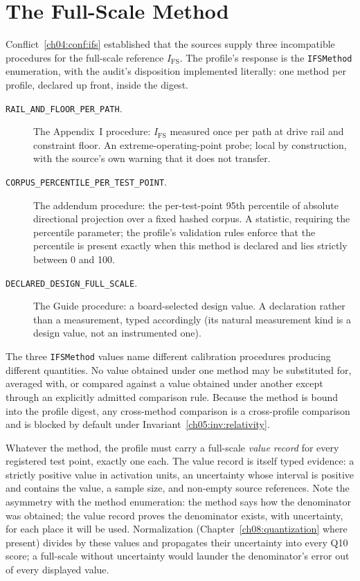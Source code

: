 \section{The Full-Scale Method}\label{ch05:ifs}

Conflict~\ref{ch04:conf:ifs} established that the sources supply three
incompatible procedures for the full-scale reference $I_{\mathrm{FS}}$. The
profile's response is the \texttt{IFSMethod} enumeration, with the audit's
disposition implemented literally: one method per profile, declared up
front, inside the digest.

\begin{description}
\item[\texttt{RAIL\_AND\_FLOOR\_PER\_PATH}.] The Appendix~I procedure:
$I_{\mathrm{FS}}$ measured once per path at drive rail and constraint
floor. An extreme-operating-point probe; local by construction, with the
source's own warning that it does not transfer.
\item[\texttt{CORPUS\_PERCENTILE\_PER\_TEST\_POINT}.] The addendum
procedure: the per-test-point 95th percentile of absolute directional
projection over a fixed hashed corpus. A statistic, requiring the
percentile parameter; the profile's validation rules enforce that the
percentile is present exactly when this method is declared and lies
strictly between 0 and 100.
\item[\texttt{DECLARED\_DESIGN\_FULL\_SCALE}.] The Guide procedure: a
board-selected design value. A declaration rather than a measurement, typed
accordingly (its natural measurement kind is a design value, not an
instrumented one).
\end{description}

\begin{ruleenv}\label{ch05:rule:ifs}
The three \texttt{IFSMethod} values name different calibration procedures
producing different quantities. No value obtained under one method may be
substituted for, averaged with, or compared against a value obtained under
another except through an explicitly admitted comparison rule. Because the
method is bound into the profile digest, any cross-method comparison is a
cross-profile comparison and is blocked by default under
Invariant~\ref{ch05:inv:relativity}.
\end{ruleenv}

Whatever the method, the profile must carry a full-scale \emph{value record}
for every registered test point, exactly one each. The value record is
itself typed evidence: a strictly positive value in activation units, an
uncertainty whose interval is positive and contains the value, a sample
size, and non-empty source references. Note the asymmetry with the method
enumeration: the method says how the denominator was obtained; the value
record proves the denominator exists, with uncertainty, for each place it
will be used. Normalization (Chapter~\ref{ch08:quantization} where present)
divides by these values and propagates their uncertainty into every Q10
score; a full-scale without uncertainty would launder the denominator's
error out of every displayed value.

